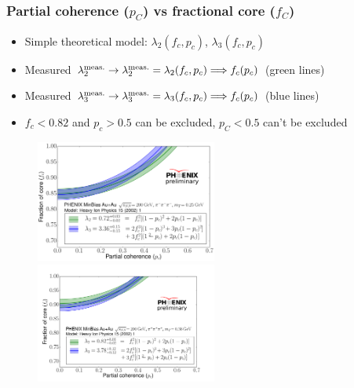 \documentclass{beamer}
\begin{document}
\begin{frame}
\frametitle{Partial coherence ($p_C$) vs fractional core ($f_C$)}
\begin{itemize}
\setlength{\itemsep}{8pt}
\vspace{-0.004\textheight}
\item Simple theoretical model: $\lambda_2(f_c, p_c)$, $\lambda_3(f_c, p_c)$ 
\item Measured $\lambda_2^{\rm meas.} \rightarrow \lambda_2^{\rm meas.}=\lambda_2(f_c,p_c) \Longrightarrow f_c(p_c)$ (green lines)
\item Measured $\lambda_3^{\rm meas.} \rightarrow \lambda_3^{\rm meas.}=\lambda_3(f_c,p_c) \Longrightarrow f_c(p_c)$ (blue lines)
\item $f_c<0.82$ and $p_c>0.5$ can be excluded, $p_C<0.5$ can't be excluded
\end{itemize}

\begin{figure}
\hspace*{-0.29cm}\includegraphics[width=0.53\textwidth]{pic/cropped_fcpc1}
\hspace*{-0.05cm}\includegraphics[width=0.53\textwidth]{pic/cropped_fcpc2}
\end{figure}
\end{frame}
\end{document}
